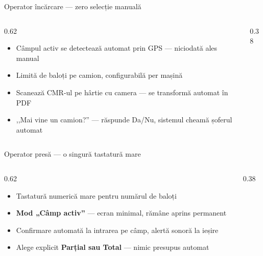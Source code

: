 \documentclass[aspectratio=169,10pt]{beamer}
\begin{document}
\begin{frame}{Operator încărcare — zero selecție manuală}
  \begin{columns}[T]
    \begin{column}{0.62\linewidth}
      \vspace{0.3cm}
      \begin{itemize}
        \item Câmpul activ se detectează automat prin GPS — niciodată ales manual
        \item Limită de baloți pe camion, configurabilă per mașină
        \item Scanează CMR-ul pe hârtie cu camera — se transformă automat în PDF
        \item ,,Mai vine un camion?'' — răspunde Da/Nu, sistemul cheamă șoferul automat
      \end{itemize}
    \end{column}
    \begin{column}{0.38\linewidth}
    \end{column}
  \end{columns}
\end{frame}

\begin{frame}{Operator presă — o singură tastatură mare}
  \begin{columns}[T]
    \begin{column}{0.62\linewidth}
      \vspace{0.3cm}
      \begin{itemize}
        \item Tastatură numerică mare pentru numărul de baloți
        \item \textbf{Mod „Câmp activ''} — ecran minimal, rămâne aprins permanent
        \item Confirmare automată la intrarea pe câmp, alertă sonoră la ieșire
        \item Alege explicit \textbf{Parțial sau Total} — nimic presupus automat
      \end{itemize}
    \end{column}
    \begin{column}{0.38\linewidth}
    \end{column}
  \end{columns}
\end{frame}
\end{document}
